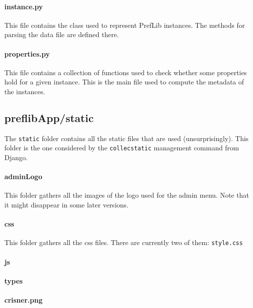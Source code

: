 \documentclass{report}
\begin{document}
	\paragraph*{\faFileO{} instance.py} This file contains the class used to represent PrefLib instances. The methods for parsing the data file are defined there.
	
	\paragraph*{\faFileO{} properties.py} This file contains a collection of functions used to check whether some properties hold for a given instance. This is the main file used to compute the metadata of the instances.
	
	\subsection*{\faFolderO{} preflibApp/static}
	
	The \texttt{static} folder contains all the static files that are used (unsurprisingly). This folder is the one considered by the \texttt{collecstatic} management command from Django.
	
	\paragraph*{\faFolderO{} adminLogo} This folder gathers all the images of the logo used for the admin menu. Note that it might disappear in some later versions.
	
	\paragraph*{\faFolderO{} css} This folder gathers all the css files. There are currently two of them: \texttt{style.css}
	
	\paragraph*{\faFolderO{} js}
	
	\paragraph*{\faFolderO{} types}
	
	\paragraph*{\faFileO{} crisner.png}
	
\end{document}
